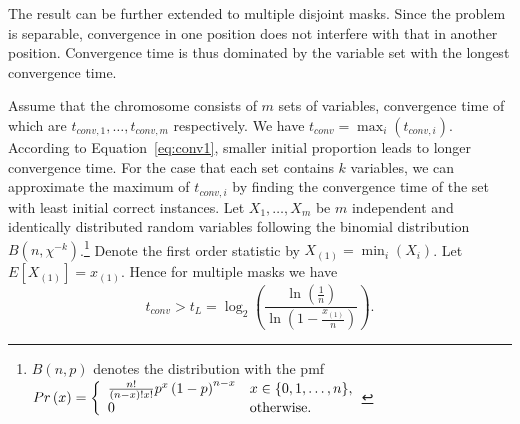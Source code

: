 \documentclass{sig-alternate}
\begin{document}

The result can be further extended to multiple disjoint masks.
Since the problem is separable,
convergence in one position does not interfere with that in another position.
Convergence time is thus dominated by the variable set with the longest convergence time.

Assume that the chromosome consists of $m$ sets of variables,
convergence time of which are
$t_{conv,1}, \dots, t_{conv,m}$ respectively.
We have $t_{conv} = \max_i\left({t_{conv,i}}\right)$.
According to Equation~\ref{eq:conv1},
smaller initial proportion leads to longer convergence time.
For the case that each set contains $k$ variables,
we can approximate the maximum of $t_{conv,i}$ by finding the convergence time of the set with
least initial correct instances.
Let $X_1, \dots, X_m$ be $m$ independent and identically distributed random variables following the binomial distribution $B\left(n,\chi^{-k}\right)$.\footnote
{
$B\left(n,p\right)$ denotes the distribution with the
pmf $Pr\left(x\right)=
\left\{
\begin{array}{l l}
\frac{n!}{\left(n-x\right)!x!} p^x \left(1-p\right)^{n-x} & x\in\{0,1,\dots,n\}, \\
0 & \text{otherwise}.
\end{array}
\right.$
}
Denote the first order statistic by $X_{\left(1\right)}=\min_i\left(X_i\right)$. Let $E[X_{\left(1\right)}] = x_{\left(1\right)}$.
Hence for multiple masks we have
\begin{equation}
\label{eq:conv}
t_{conv} > t_L = 
\log_2 \left(\frac{\ln \left(\frac{1}{n}\right)}{\ln\left(1-\frac{x_{\left(1\right)}}{n}\right)}\right).
\end{equation}
\end{document}
